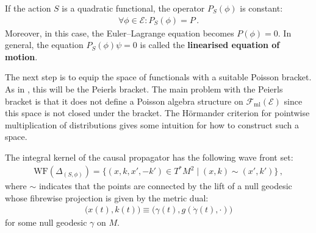     \begin{property}
        If the action $S$ is a quadratic functional, the operator $P_S(\phi)$ is constant:
        \begin{gather}
            \forall\phi\in\mathcal{E}:P_S(\phi)=P\,.
        \end{gather}
        Moreover, in this case, the Euler--Lagrange equation becomes $P(\phi) = 0$. In general, the equation $P_S(\phi)\psi=0$ is called the \textbf{linearised equation of motion}.
    \end{property}

    The next step is to equip the space of functionals with a suitable Poisson bracket. As in , this will be the Peierls bracket.
    The main problem with the Peierls bracket is that it does not define a Poisson algebra structure on $\mathcal{F}_{\text{ml}}(\mathcal{E})$ since this space is not closed under the bracket. The H\"ormander criterion for pointwise multiplication of distributions gives some intuition for how to construct such a space.

    \begin{property}\label{aqft:causal_support}
        The integral kernel of the causal propagator has the following wave front set:
        \begin{gather}
            \mathrm{WF}(\Delta_{(S,\phi)}) = \{(x,k,x',-k')\in T^*M^2\mid(x,k)\sim(x',k')\}\,,
        \end{gather}
        where $\sim$ indicates that the points are connected by the lift of a null geodesic whose fibrewise projection is given by the metric dual:
        \begin{gather}
            \bigl(x(t),k(t)\bigr)\equiv\bigl(\gamma(t),g(\dot{\gamma}(t),\cdot)\bigr)
        \end{gather}
        for some null geodesic $\gamma$ on $M$.
    \end{property}


